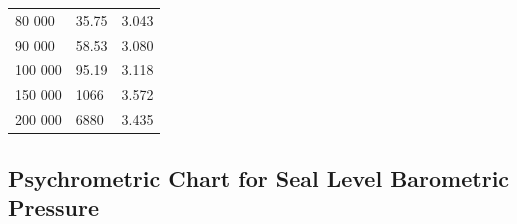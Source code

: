 \documentclass[
]{book}
\begin{document}
\begin{longtable}[]{@{}lll@{}}
\begin{minipage}[t]{0.25\columnwidth}
80 000\strut
\end{minipage} & \begin{minipage}[t]{0.28\columnwidth}\raggedright
35.75\strut
\end{minipage} & \begin{minipage}[t]{0.28\columnwidth}\raggedright
3.043\strut
\end{minipage}\tabularnewline
\begin{minipage}[t]{0.25\columnwidth}\raggedright
90 000\strut
\end{minipage} & \begin{minipage}[t]{0.28\columnwidth}\raggedright
58.53\strut
\end{minipage} & \begin{minipage}[t]{0.28\columnwidth}\raggedright
3.080\strut
\end{minipage}\tabularnewline
\begin{minipage}[t]{0.25\columnwidth}\raggedright
100 000\strut
\end{minipage} & \begin{minipage}[t]{0.28\columnwidth}\raggedright
95.19\strut
\end{minipage} & \begin{minipage}[t]{0.28\columnwidth}\raggedright
3.118\strut
\end{minipage}\tabularnewline
\begin{minipage}[t]{0.25\columnwidth}\raggedright
150 000\strut
\end{minipage} & \begin{minipage}[t]{0.28\columnwidth}\raggedright
1066\strut
\end{minipage} & \begin{minipage}[t]{0.28\columnwidth}\raggedright
3.572\strut
\end{minipage}\tabularnewline
\begin{minipage}[t]{0.25\columnwidth}\raggedright
200 000\strut
\end{minipage} & \begin{minipage}[t]{0.28\columnwidth}\raggedright
6880\strut
\end{minipage} & \begin{minipage}[t]{0.28\columnwidth}\raggedright
3.435\strut
\end{minipage}\tabularnewline
\bottomrule
\end{longtable}

\hypertarget{psychrometric-chart-for-seal-level-barometric-pressure}{%
\subsection*{Psychrometric Chart for Seal Level Barometric Pressure}\label{psychrometric-chart-for-seal-level-barometric-pressure}}
\end{document}

